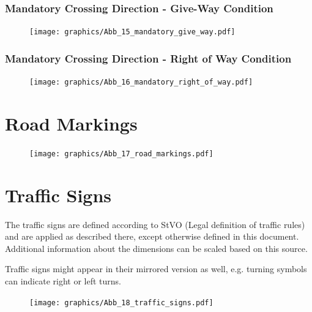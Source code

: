 \vspace{-1em}

\subsubsection{Mandatory Crossing Direction - Give-Way Condition}
\begin{figure}[H]
	\begin{center}
		\centering\texttt{[image: graphics/Abb\_15\_mandatory\_give\_way.pdf]}
	\end{center}
\end{figure}

\subsubsection{Mandatory Crossing Direction - Right of Way Condition}
\begin{figure}[H]
	\begin{center}
		\centering\texttt{[image: graphics/Abb\_16\_mandatory\_right\_of\_way.pdf]}
	\end{center}
\end{figure}

\vspace{-1em}

\section{Road Markings}
\label{fig_road_markings}
\begin{figure}[H]
	\begin{center}
		\centering\texttt{[image: graphics/Abb\_17\_road\_markings.pdf]}
	\end{center}
\end{figure}

\section{Traffic Signs}
\label{fig_traffic_signs}

The traffic signs are defined according to StVO (Legal definition of traffic
rules) and are applied as described there, except otherwise defined in this
document. Additional information about the dimensions can be scaled based on
this source.

Traffic signs might appear in their mirrored version as well, e.g. turning
symbols can indicate right or left turns.

\begin{figure}[H]
	\begin{center}
		\centering\texttt{[image: graphics/Abb\_18\_traffic\_signs.pdf]}
	\end{center}
\end{figure}

